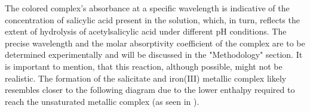 \documentclass{article}
\begin{document}
The colored complex's absorbance at a specific wavelength is indicative of the concentration of salicylic acid present in the solution, which, in turn, reflects the extent of hydrolysis of acetylsalicylic acid under different pH conditions. The precise wavelength and the molar absorptivity coefficient of the complex are to be determined experimentally and will be discussed in the "Methodology" section. It is important to mention, that this reaction, although possible, might not be realistic. The formation of the salicitate and iron(III) metallic complex likely resembles closer to the following diagram due to the lower enthalpy required to reach the unsaturated metallic complex (as seen in \cite{campanile2016development}).

\begin{figure}[H]
\centering
    \begin{tikzpicture}[x=0.75pt,y=0.75pt,yscale=-1,xscale=1]
    

\end{tikzpicture}
\end{figure}
\end{document}

